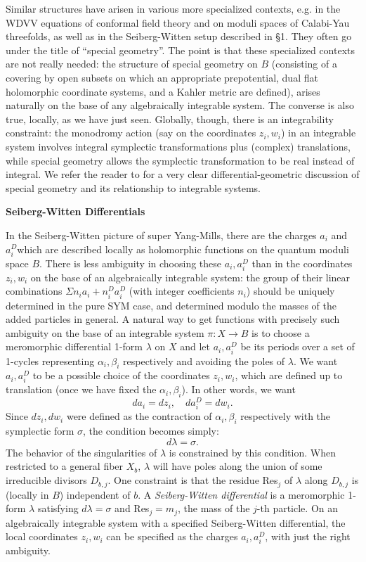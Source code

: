Similar structures have arisen in various more specialized 
contexts, e.g. in the
WDVV equations of conformal field theory and on moduli spaces 
of Calabi-Yau
threefolds, as well as in the Seiberg-Witten setup described 
in \S 1.  They often
go under the title of ``special geometry''.  The point is that 
these specialized
contexts are not really needed:  the structure of special 
geometry on $B$
(consisting of a covering by open subsets on which an 
appropriate prepotential,
dual flat holomorphic coordinate systems, and a Kahler 
metric are defined),
arises naturally on the base of any algebraically 
integrable system.  The
converse is also true, locally, as we have just seen.  
Globally, though, there is
an integrability constraint:  the monodromy action 
(say on the coordinates $z_i,
w_i$) in an integrable system involves integral 
symplectic transformations plus
(complex) translations, while special geometry 
allows the symplectic
transformation to be real instead of integral.  
We refer the reader to \cite{F}
for a very clear differential-geometric discussion 
of special geometry and its
relationship to integrable systems.

\medskip\noindent
{\bf Seiberg-Witten Differentials}

In the Seiberg-Witten picture of super Yang-Mills, 
there are the charges 
$a_i$ and $a_i^D$which are described locally as holomorphic 
functions on
the quantum moduli space $B$.  There is less ambiguity in 
choosing these $a_i,
a_i^D$ than in the coordinates $z_i, w_i$ on the base of 
an algebraically
integrable system:  the group of their linear combinations 
$\Sigma n_i a_i +
n_i^Da_i^D$ (with integer coefficients $n_i$) should be 
uniquely determined in
the pure SYM case, and determined modulo the masses of the 
added particles in
general.  A natural way to get functions with precisely 
such ambiguity on the
base of an integrable system $\pi: X\to B$ is to choose a 
meromorphic
differential 1-form $\lambda$ on $X$ and let $a_i, a_i^D$ 
be its periods over a
set of 1-cycles representing $\alpha_i,\beta_i$ respectively 
and avoiding the
poles of $\lambda$.  We want $a_i, a_i^D$ to be a possible 
choice of the
coordinates $z_i, w_i$, which are defined up to translation 
(once we have fixed
the $\alpha_i, \beta_i$).  In other words, we want
$$
da_i = dz_i, \quad da_i^D = dw_i.
$$
Since $dz_i, dw_i$ were defined as the contraction of 
$\alpha_i, \beta_i$
respectively with the symplectic form $\sigma$, the condition 
becomes simply:
$$
d\lambda = \sigma.
$$
The behavior of the singularities of $\lambda$ is constrained 
by this condition.
When restricted to a general fiber $X_b$, $\lambda$ will have 
poles along the
union of some irreducible divisors $D_{b,j}$.  One constraint
is that the
residue Res$_j$ of $\lambda$ along $D_{b,j}$ is (locally in $B$) 
independent of
$b$.  A {\it Seiberg-Witten differential} is a meromorphic 1-form 
$\lambda$
satisfying $d\lambda = \sigma$ and Res$_j = m_j$, the mass of the 
$j$-th
particle.  On an algebraically integrable system with a specified 
Seiberg-Witten
differential, the local coordinates $z_i, w_i$ can be specified as
the charges $a_i, a_i^D$, with just the right ambiguity.

